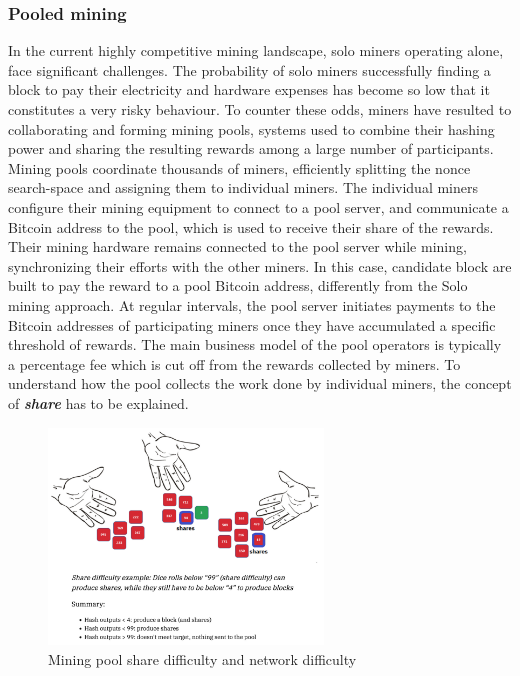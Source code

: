 \subsubsection{Pooled mining}
In the current highly competitive mining landscape, solo miners operating alone, face significant challenges. The probability of solo miners successfully finding a block to pay their electricity and hardware expenses has become so low that it constitutes a very risky behaviour. To counter these odds, miners have resulted to collaborating and forming mining pools, systems used to combine their hashing power and sharing the resulting rewards among a large number of participants.\\
Mining pools coordinate thousands of miners, efficiently splitting the nonce search-space and assigning them to individual miners. The individual miners configure their mining equipment to connect to a pool server, and communicate a Bitcoin address to the pool, which is used to receive their share of the rewards. Their mining hardware remains connected to the pool server while mining, synchronizing their efforts with the other miners. In this case, candidate block are built to pay the reward to a pool Bitcoin address, differently from the Solo mining approach. At regular intervals, the pool server initiates payments to the Bitcoin addresses of participating miners once they have accumulated a specific threshold of rewards. The main business model of the pool operators is typically a percentage fee which is cut off from the rewards collected by miners.
To understand how the pool collects the work done by individual miners, the concept of \textbf{\textit{share}} has to be explained.
\begin{figure}
\centering
\includegraphics[width=0.65\textwidth]{Figures/mining/share.png}
\caption{Mining pool share difficulty and network difficulty \cite{bitcoinmininghandbook}}
\label{fig:mining-share}
\end{figure}
